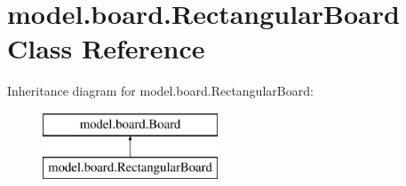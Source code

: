 \hypertarget{classmodel_1_1board_1_1_rectangular_board}{\section{model.\-board.\-Rectangular\-Board Class Reference}
\label{classmodel_1_1board_1_1_rectangular_board}
}
Inheritance diagram for model.\-board.\-Rectangular\-Board\-:\begin{figure}[H]
\begin{center}
\leavevmode
\includegraphics[height=2.000000cm]{classmodel_1_1board_1_1_rectangular_board}
\end{center}
\end{figure}
